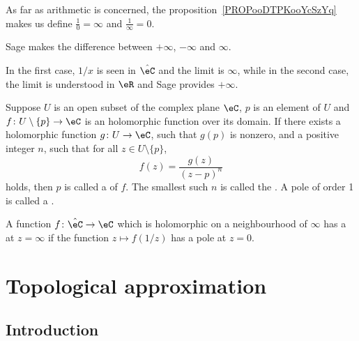 As far as arithmetic is concerned, the proposition~\ref{PROPooDTPKooYcSzYq} makes us  define \( \frac{1}{ 0 }=\infty\) and \( \frac{ 1 }{ \infty }=0\).

\begin{remark}
	
	Sage makes the difference between \( +\infty\), \( -\infty\) and \( \infty\).

	In the first case, \( 1/x\) is seen in \( \hat \eC\) and the limit is \( \infty\), while in the second case, the limit is understood in \( \eR\) and Sage provides \( +\infty\).
\end{remark}

\begin{definition}       \label{DEFooPXYYooOMZYOT}
	Suppose \( U\) is an open subset of the complex plane \( \eC\), $p$ is an element of $U$ and \( f\colon U\setminus\{ p \}\to \eC\) is an holomorphic function  over its domain. If there exists a holomorphic function \( g\colon U\to \eC\), such that $g(p)$ is nonzero, and a positive integer $n$, such that for all \( z\in U\setminus\{ p \}\),
	\begin{equation}
		f(z)=\frac{ g(z) }{ (z-p)^n }
	\end{equation}
	holds, then $p$ is called a  of \( f\). The smallest such $n$ is called the . A pole of order 1 is called a .

	A function \( f\colon \hat \eC\to \eC\) which is holomorphic on a neighbourhood of \( \infty\) has a  at \( z=\infty\) if the function \( z\mapsto f(1/z)\) has a pole at \( z=0\).
\end{definition}

\section{Topological approximation}
\subsection{Introduction}

